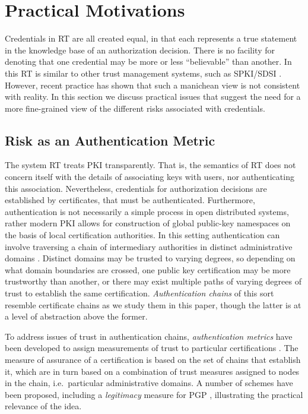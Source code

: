 \section{Practical Motivations}
\label{section-risk-assignment}

Credentials in RT are all created equal, in that each represents a
true statement in the knowledge base of an authorization decision.
There is no facility for denoting that one credential may be more or
less ``believable'' than another.  In this RT is similar to other
trust management systems, such as SPKI/SDSI \cite{ellison-etal-rfc99}.
However, recent practice has shown that such a manichean view is not
consistent with reality.  In this section we discuss practical issues
that suggest the need for a more fine-grained view of the different
risks associated with credentials.

\subsection{Risk as an Authentication Metric}

The system RT treats PKI transparently.  That is, the semantics of RT
does not concern itself with the details of associating keys with
users, nor authenticating this association.  Nevertheless, credentials
for authorization decisions are established by certificates, that must
be authenticated.  Furthermore, authentication is not necessarily a
simple process in open distributed systems, rather modern PKI allows
for construction of global public-key namespaces on the basis of local
certification authorities.  In this setting authentication can involve
traversing a chain of intermediary authorities in distinct
administrative domains \cite{birrell-etal-oakland86}.  Distinct
domains may be trusted to varying degrees, so depending on what domain
boundaries are crossed, one public key certification may be more
trustworthy than another, or there may exist multiple paths of varying
degrees of trust to establish the same certification.
\emph{Authentication chains} of this sort resemble certificate chains
as we study them in this paper, though the latter is at a level of
abstraction above the former.

To address issues of trust in authentication chains,
\emph{authentication metrics} have been developed to assign
measurements of trust to particular certifications
\cite{reiter-stubblebine-tissec99}.  The measure of assurance of a
certification is based on the set of chains that establish it, which
are in turn based on a combination of trust measures assigned to nodes
in the chain, i.e.~particular administrative domains.  A number of
schemes have been proposed, including a \emph{legitimacy} measure for
PGP \cite{Abdul-Rahman-EDI97}, illustrating the practical relevance of
the idea.

